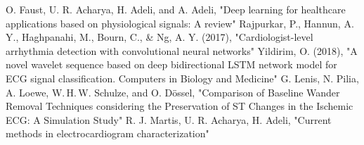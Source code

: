 \documentclass[journal]{IEEEtran}
\begin{document}
\newpage
\begin{thebibliography}{1}
 O. Faust, U. R. Acharya, H. Adeli, and A. Adeli, "Deep learning for healthcare applications based on physiological signals: A review"
 Rajpurkar, P., Hannun, A. Y., Haghpanahi, M., Bourn, C., \& Ng, A. Y. (2017), "Cardiologist-level arrhythmia detection with convolutional neural networks"
 Yildirim, O. (2018), "A novel wavelet sequence based on deep bidirectional LSTM network model for ECG signal classification. Computers in Biology and Medicine"
 G. Lenis, N. Pilia, A. Loewe, W. H. W. Schulze, and O. Dössel, "Comparison of Baseline Wander Removal Techniques considering the Preservation of ST Changes in the Ischemic ECG: A Simulation Study"
 R. J. Martis, U. R. Acharya, H. Adeli, "Current methods in electrocardiogram characterization"

\end{thebibliography}
\end{document}
